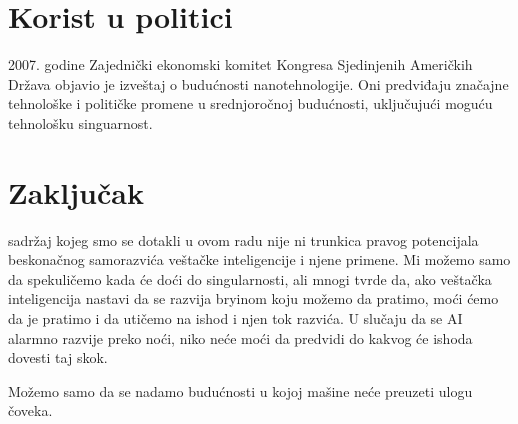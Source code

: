 \documentclass[a4paper]{article}
\begin{document}
\section{Korist u politici}
\label{sec:politika}
2007. godine Zajednički ekonomski komitet Kongresa Sjedinjenih Američkih Država objavio je izveštaj o budućnosti nanotehnologije. Oni predviđaju značajne tehnološke i političke promene u srednjoročnoj budućnosti, uključujući moguću tehnološku singuarnost.\cite{refe9}

\section{Zaključak}
\label{sec:zakljucak}
sadržaj kojeg smo se dotakli u ovom radu nije ni trunkica pravog potencijala beskonačnog samorazvića veštačke inteligencije i njene primene. Mi možemo samo da spekuličemo kada će doći do singularnosti, ali mnogi tvrde da, ako veštačka inteligencija nastavi da se razvija bryinom koju možemo da pratimo, moći ćemo da je pratimo i da utičemo na ishod i njen tok razvića. U slučaju da se AI alarmno razvije preko noći, niko neće moći da predvidi do kakvog će ishoda dovesti taj skok.

Možemo samo da se nadamo budućnosti u kojoj mašine neće preuzeti ulogu čoveka.

\appendix

\end{document}
